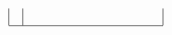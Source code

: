 \documentclass[10pt,fleqn]{article}
\theoremstyle{plain}
\theoremstyle{definition}
\renewcommand{\(}{\left(}
\renewcommand{\)}{\right)}
\renewcommand{\[}{\left[}
\renewcommand{\]}{\right]}
\renewcommand{\{}{\left\lbrace}
\renewcommand{\}}{\right\rbrace}
\begin{document}
\begin{figure}[H]
\begin{align*}
\begin{array}{|c|cccccccccc|}
 &  &  &  &  &  &  &  &  &  &  \\
            \hline
        \end{array}
    \end{align*}
\end{figure}
\end{document}
